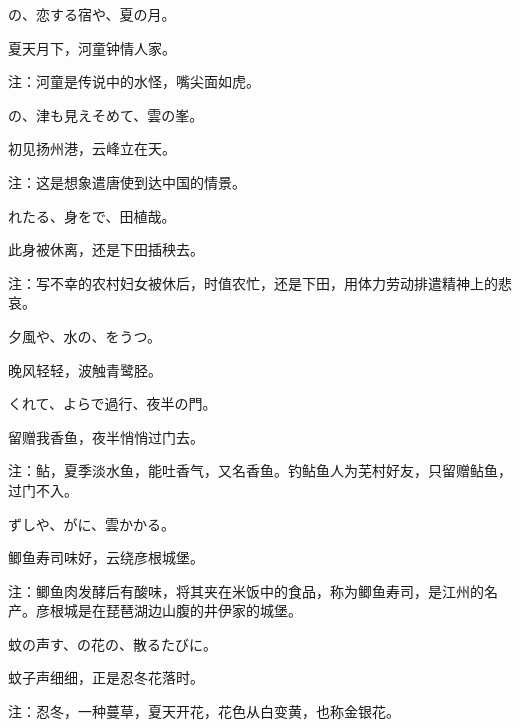 \begin{haiku}
    {\FH {}の、恋する宿や、夏の月。}

    {\FK 夏天月下，河童钟情人家。}

    {\FT 注：河童是传说中的水怪，嘴尖面如虎。}
\end{haiku}

\begin{haiku}
    {\FH {}の、津も見えそめて、雲の峯。}

    {\FK 初见扬州港，云峰立在天。}

    {\FT 注：这是想象遣唐使到达中国的情景。}
\end{haiku}

\begin{haiku}
    {\FH {}れたる、身をで、田植哉。}

    {\FK 此身被休离，还是下田插秧去。}

    {\FT 注：写不幸的农村妇女被休后，时值农忙，还是下田，用体力劳动排遣精神上的悲哀。}
\end{haiku}

\begin{haiku}
    {\FH 夕風や、水の、をうつ。}

    {\FK 晚风轻轻，波触青鹭胫。}
\end{haiku}

\begin{haiku}
    {\FH {}くれて、よらで過行、夜半の門。}

    {\FK 留赠我香鱼，夜半悄悄过门去。}

    {\FT 注：鲇，夏季淡水鱼，能吐香气，又名香鱼。钓鲇鱼人为芜村好友，只留赠鲇鱼，过门不入。}
\end{haiku}

\begin{haiku}
    {\FH {}ずしや、がに、雲かかる。}

    {\FK 鲫鱼寿司味好，云绕彦根城堡。}

    {\FT 注：鲫鱼肉发酵后有酸味，将其夹在米饭中的食品，称为鲫鱼寿司，是江州的名产。彦根城是在琵琶湖边山腹的井伊家的城堡。}
\end{haiku}

\begin{haiku}
    {\FH 蚊の声す、の花の、散るたびに。}

    {\FK 蚊子声细细，正是忍冬花落时。}

    {\FT 注：忍冬，一种蔓草，夏天开花，花色从白变黄，也称金银花。}
\end{haiku}

